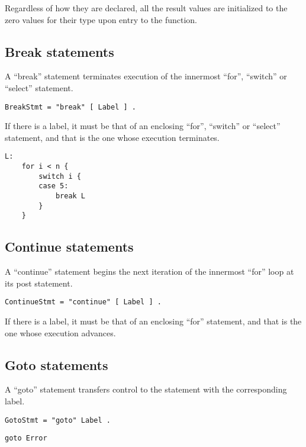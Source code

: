 Regardless of how they are declared, all the result values are
initialized to the zero values for their type upon entry to the
function.

\subsection*{Break statements}

A ``break'' statement terminates execution of the innermost ``for'',
``switch'' or ``select'' statement.

\begin{Verbatim}[frame=single]
BreakStmt = "break" [ Label ] .
\end{Verbatim}

If there is a label, it must be that of an enclosing ``for'', ``switch''
or ``select'' statement, and that is the one whose execution terminates.

\begin{Verbatim}[frame=single]
L:
    for i < n {
        switch i {
        case 5:
            break L
        }
    }
\end{Verbatim}

\subsection*{Continue statements}

A ``continue'' statement begins the next iteration of the innermost
``for'' loop at its post statement.

\begin{Verbatim}[frame=single]
ContinueStmt = "continue" [ Label ] .
\end{Verbatim}

If there is a label, it must be that of an enclosing ``for'' statement,
and that is the one whose execution advances.

\subsection*{Goto statements}

A ``goto'' statement transfers control to the statement with the
corresponding label.

\begin{Verbatim}[frame=single]
GotoStmt = "goto" Label .
\end{Verbatim}

\begin{Verbatim}[frame=single]
goto Error
\end{Verbatim}

